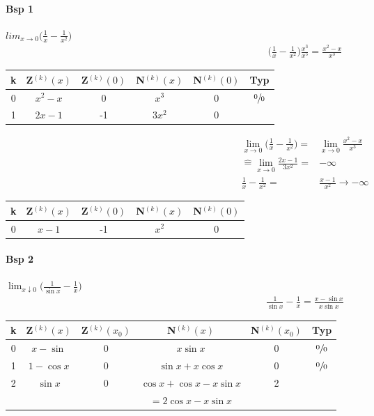 \documentclass{article}
\begin{document}
\paragraph{Bsp 1} $lim_{x \to 0} \bigg(\frac{1}{x} - \frac{1}{x^2}\bigg)$ %
\begin{align*}
	\bigg(\frac{1}{x}-\frac{1}{x^2}\bigg)\frac{x^3}{x^5}=\frac{x^2 - x}{x^3}
\end{align*}
\begin{tabular}{ c c c c c | c } 
	k & Z$^{(k)}(x)$ & Z$^{(k)}(0)$ & N$^{(k)}(x)$ & N$^{(k)}(0)$ & Typ 
	\\
 	\hline 
 	0 & $x^2-x$ & 0 & $x^3$ & 0 & $\sfrac{0}
 	{0}$ \\ 
	1 & $2x-1$ & -1 & $3x^2$ & 0 & \\ 
\end{tabular}
\begin{align*}
	\lim_{x \to 0}\bigg(\frac{1}{x}-\frac{1}{x^2}\bigg) =& 
	\lim_{x \to 0}\frac{x^2-x}{x^3}
	\\
	\widehat{=} \lim_{x \to 0} \frac{2x - 1}{3x^2} =& - \infty \\
	\frac{1}{x} - \frac{1}{x^2} =& \frac{x-1}{x^2} \to - \infty 
\end{align*}
\begin{tabular}{ c c c c c } 
	k & Z$^{(k)}(x)$ & Z$^{(k)}(0)$ & N$^{(k)}(x)$ & N$^{(k)}(0)$ 
	\\
 	\hline 
 	0 & $x-1$ & -1 & $x^2$ & 0 \\ 
\end{tabular}
\paragraph{Bsp 2} $\lim_{x \downarrow 0}\bigg(\frac{1}{\sin{x}}-\frac{1}{x}\bigg)$
\begin{align*}
	\frac{1}{\sin{x}} - \frac{1}{x} = \frac{x - \sin{x}}{x\sin{x}}
\end{align*}
\begin{tabular}{ c c c c c | c } 
	k & Z$^{(k)}(x)$ & Z$^{(k)}(x_0)$ & N$^{(k)}(x)$ & N$^{(k)}(x_0)$ & Typ 
	\\
 	\hline 
 	0 & $x-\sin$    & 0 & $x\sin{x}$ & 0 & $\sfrac{0}{0}$ \\ 
	1 & $1-\cos{x}$ & 0 & $\sin{x}+x\cos{x}$ & 0 & $\sfrac{0}{0}$\\
	2 & $\sin{x}$   & 0 & $\cos{x}+\cos{x}-x\sin{x}$ & 2 &\\
	  &             &   & $=2\cos{x}-x\sin{x}$
\end{tabular}
\end{document}
